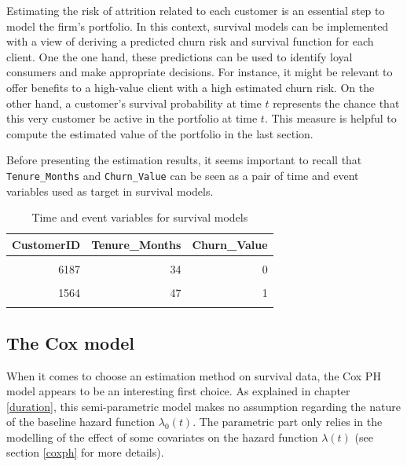 \documentclass[
]{book}
\begin{document}
Estimating the risk of attrition related to each customer is an essential step to model the firm's portfolio. In this context, survival models can be implemented with a view of deriving a predicted churn risk and survival function for each client. One the one hand, these predictions can be used to identify loyal consumers and make appropriate decisions. For instance, it might be relevant to offer benefits to a high-value client with a high estimated churn risk. On the other hand, a customer's survival probability at time \(t\) represents the chance that this very customer be active in the portfolio at time \(t\). This measure is helpful to compute the estimated value of the portfolio in the last section.

Before presenting the estimation results, it seems important to recall that \texttt{Tenure\_Months} and \texttt{Churn\_Value} can be seen as a pair of time and event variables used as target in survival models.

\begin{table}[H]

\caption{\label{tab:survtarget}Time and event variables for survival models}
\centering
\begin{tabular}[t]{rrr}
\toprule
CustomerID & Tenure\_Months & Churn\_Value\\
\midrule
\cellcolor{gray!6}{2058} & \cellcolor{gray!6}{41} & \cellcolor{gray!6}{0}\\
6187 & 34 & 0\\
\cellcolor{gray!6}{4576} & \cellcolor{gray!6}{44} & \cellcolor{gray!6}{0}\\
1564 & 47 & 1\\
\cellcolor{gray!6}{4710} & \cellcolor{gray!6}{19} & \cellcolor{gray!6}{0}\\
\bottomrule
\end{tabular}
\end{table}

\hypertarget{the-cox-model}{%
\subsection{The Cox model}\label{the-cox-model}}

When it comes to choose an estimation method on survival data, the Cox PH model appears to be an interesting first choice. As explained in chapter \ref{duration}, this semi-parametric model makes no assumption regarding the nature of the baseline hazard function \(\lambda_0(t)\). The parametric part only relies in the modelling of the effect of some covariates on the hazard function \(\lambda(t)\) (see section \ref{coxph} for more details).
\end{document}
